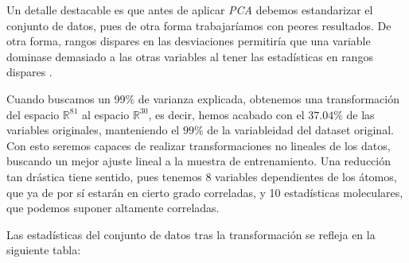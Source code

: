 \documentclass[11pt]{article}
\begin{document}
Un detalle destacable es que antes de aplicar \emph{PCA} debemos estandarizar el conjunto de datos, pues de otra forma trabajaríamos con peores resultados. De otra forma, rangos dispares en las desviaciones permitiría que una variable dominase demasiado a las otras variables al tener las estadísticas en rangos dispares \cite{normalize_before_pca:online}.

Cuando buscamos un 99\% de varianza explicada, obtenemos una transformación del espacio $\mathbb{R}^{81}$ al espacio $\mathbb{R}^{30}$, es decir, hemos acabado con el $37.04\%$ de las variables originales, manteniendo el $99\%$ de la variableidad del dataset original. Con esto seremos capaces de realizar transformaciones no lineales de los datos, buscando un mejor ajuste lineal a la muestra de entrenamiento. Una reducción tan drástica tiene sentido, pues tenemos 8 variables dependientes de los átomos, que ya de por sí estarán en cierto grado correladas, y 10 estadísticas moleculares, que podemos suponer altamente correladas.


Las estadísticas del conjunto de datos tras la transformación se refleja en la siguiente tabla:
\end{document}

